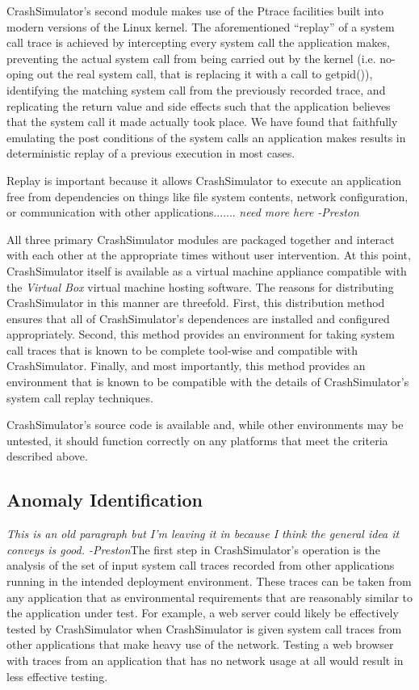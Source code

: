     CrashSimulator's second module makes use of the Ptrace facilities built into modern versions of the Linux
    kernel. The aforementioned ``replay'' of a system call trace is achieved by intercepting every system call the
    application makes, preventing the actual system call from being carried out by the kernel (i.e. no-oping out the
    real system call, that is replacing it with a call to getpid()), identifying the matching system call from the
    previously recorded trace, and replicating the return value and side effects such that the application believes that
    the system call it made actually took place. We have found that faithfully emulating the post conditions of the
    system calls an application makes results in deterministic replay of a previous execution in most cases.

    Replay is important because it allows CrashSimulator to execute an application free from dependencies on things like
    file system contents, network configuration, or communication with other applications....... \emph{need more here
      -Preston}

    All three primary CrashSimulator modules are packaged together and interact with each other at the appropriate times
    without user intervention. At this point, CrashSimulator itself is available as a virtual machine appliance
    compatible with the \emph{Virtual Box} virtual machine hosting software. The reasons for distributing CrashSimulator
    in this manner are threefold. First, this distribution method ensures that all of CrashSimulator's dependences are
    installed and configured appropriately. Second, this method provides an environment for taking system call traces
    that is known to be complete tool-wise and compatible with CrashSimulator. Finally, and most importantly, this
    method provides an environment that is known to be compatible with the details of CrashSimulator's system call
    replay techniques.

    CrashSimulator's source code is available and, while other environments may be untested, it should function
    correctly on any platforms that meet the criteria described above.

    \subsection{Anomaly Identification}
    
    \emph{This is an old paragraph but I'm leaving it in because I think the general idea it conveys is
      good. -Preston}The first step in CrashSimulator's operation is the analysis of the set of input system call traces
    recorded from other applications running in the intended deployment environment. These traces can be taken from any
    application that as environmental requirements that are reasonably similar to the application under test. For
    example, a web server could likely be effectively tested by CrashSimulator when CrashSimulator is given system call
    traces from other applications that make heavy use of the network. Testing a web browser with traces from an
    application that has no network usage at all would result in less effective testing.
    

